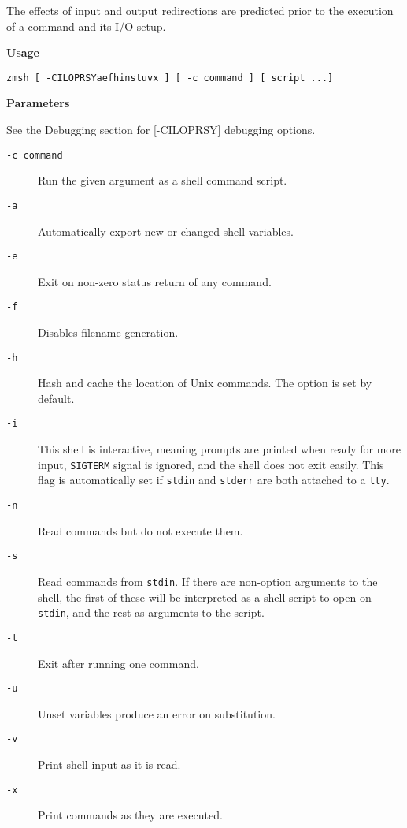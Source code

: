 The effects of input and output redirections are predicted 
prior to the execution of a command and its I/O setup.

{\bf Usage}

{\tt zmsh [ -CILOPRSYaefhinstuvx ] [ -c command ] [ script ...]}



{\bf Parameters}

See the Debugging section for [-CILOPRSY] 
debugging options. 

\begin{description}
\item[{\tt -c command}] \mbox{}

Run the given argument as a shell 
command script. 

\item[{\tt -a}] \mbox{}

Automatically export new or changed shell 
variables.  

\item[{\tt -e}] \mbox{}

Exit on non-zero status return of any command. 

\item[{\tt -f}] \mbox{}

Disables filename generation. 

\item[{\tt -h}] \mbox{}

Hash and cache the location of Unix commands. 
The option is set by default. 

\item[{\tt -i}] \mbox{}

This shell is interactive, meaning prompts 
are printed when ready for more input, {\tt SIGTERM} signal 
is ignored, and the shell does not exit easily. This flag is 
automatically set if {\tt stdin} and {\tt stderr} are 
both attached to a {\tt tty}. 

\item[{\tt -n}] \mbox{}

Read commands but do not execute them. 

\item[{\tt -s}] \mbox{}

Read commands from {\tt stdin}. If there 
are non-option arguments to the shell, the first of these will 
be interpreted as a shell script to open on {\tt stdin}, 
and the rest as arguments to the script. 

\item[{\tt -t}] \mbox{}

Exit after running one command. 

\item[{\tt -u}] \mbox{}

Unset variables produce an error on 
substitution. 

\item[{\tt -v}] \mbox{}

Print shell input as it is read. 

\item[{\tt -x}] \mbox{}

Print commands as they are executed. 

\end{description}
